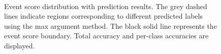\documentclass[12pt]{article}
\begin{document}
        \begin{figure}[htpb]
            \centering
             \\  
            \caption{Event score distribution with prediction results. The grey dashed lines indicate regions corresponding to different predicted labels using the max argument method. The black solid line represents the event score boundary. Total accuracy and per-class accuracies are displayed.}  
            \label{fig:event_score_distribution_w_prediction_dominated_1}  
        \end{figure}  
\end{document}
